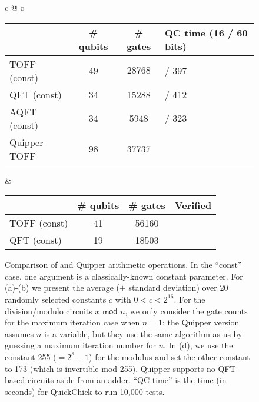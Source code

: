 \begin{figure*}[t]
{\begin{tabular}{c @{\;\;} c}
\begin{minipage}[b]{0.52\textwidth}
\begin{tabular}{|l|c|c| >{\centering\arraybackslash} m{1cm} |}
\hline
		     & \# qubits  & \# gates &  QC time (16 / 60 bits) \\
                     \hline
\oqasm TOFF (const) & 49 & $28768 $ &  16 / 397 \\
\oqasm QFT (const) & 34 & 15288 & 5 / 412 \\
\oqasm AQFT (const) & 34 & 5948 & 4 / 323 \\\hline
Quipper TOFF & 98 & 37737 &  \\
\hline                           
\end{tabular}
\end{minipage}
&
\begin{minipage}[b]{0.52\textwidth}
\centering
\begin{tabular}{|l|c|c|c|}
\hline
      & \# qubits  & \# gates & Verified   \\
                     \hline
\oqasm TOFF (const) & 41 & 56160 & \cmark \\
\oqasm QFT (const) & 19 & 18503 &\cmark \\
\hline                           
\end{tabular}
\end{minipage}
\end{tabular}
}

\caption{Comparison of \oqasm and Quipper arithmetic operations. In the ``const'' case, one argument is a classically-known constant parameter. 
For (a)-(b) we present the average ($\pm$ standard deviation) over 20 randomly selected constants $c$ with $0 < c < 2^{16}$.
For the division/modulo circuits $x \textsf{ mod } n$, we only consider the gate counts for the maximum iteration case when $n=1$; the Quipper version assumes $n$ is a variable, but they use the same algorithm as us by guessing a maximum iteration number for $n$. 
In (d), we use the constant 255 ($=2^8-1$) for the modulus and set the other constant to 173 (which is invertible mod 255). 
Quipper supports no QFT-based circuits aside from an adder. ``QC time'' is the time (in seconds) for QuickChick to run 10,000 tests.}
\label{fig:circ-evaluation}
\end{figure*}

